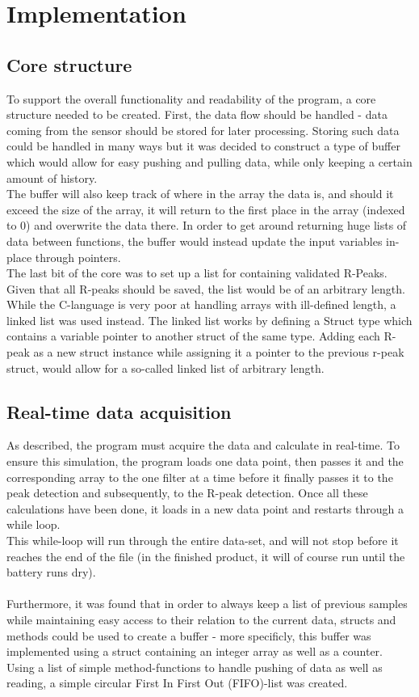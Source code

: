\documentclass[12pt,a4paper]{article}
\begin{document}
\section{Implementation}
\subsection{Core structure}
To support the overall functionality and readability of the program, a core structure needed to be created. First, the data flow should be handled - data coming from the sensor should be stored for later processing. Storing such data could be handled in many ways but it was decided to construct a type of buffer which would allow for easy pushing and pulling data, while only keeping a certain amount of history.\\
The buffer will also keep track of where in the array the data is, and should it exceed the size of the array, it will return to the first place in the array (indexed to 0) and overwrite the data there.
In order to get around returning huge lists of data between functions, the buffer would instead update the input variables in-place through pointers.\\
The last bit of the core was to set up a list for containing validated R-Peaks. Given that all R-peaks should be saved, the list would be of an arbitrary length. While the C-language is very poor at handling arrays with ill-defined length, a linked list was used instead. The linked list works by defining a Struct type which contains a variable pointer to another struct of the same type. Adding each R-peak as a new struct instance while assigning it a pointer to the previous r-peak struct, would allow for a so-called linked list of arbitrary length.

\subsection{Real-time data acquisition}
	As described, the program must acquire the data and calculate in real-time. To ensure this simulation, the program loads one data point, then passes it and the corresponding array to the one filter at a time before it finally passes it to the peak detection and subsequently, to the R-peak detection. Once all these calculations have been done, it loads in a new data point and restarts through a while loop.\\
	This while-loop will run through the entire data-set, and will not stop before it reaches the end of the file (in the finished product, it will of course run until the battery runs dry).\\
	\\
	Furthermore, it was found that in order to always keep a list of previous samples while maintaining easy access to their relation to the current data, structs and methods could be used to create a buffer - more specificly, this buffer was implemented using a struct containing an integer array as well as a counter. Using a list of simple method-functions to handle pushing of data as well as reading, a simple circular First In First Out (FIFO)-list was created.
	
\end{document}
